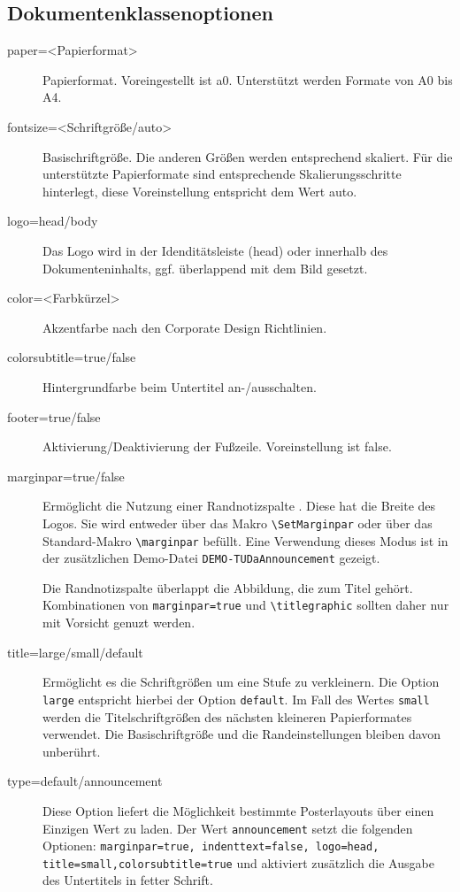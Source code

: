 \documentclass[
	paper=a0,
	ngerman,
	accentcolor=9c,
	logo=body,%
	footer=true,
	]{tudaposter}
\let\file\texttt
\let\code\texttt
\let\tbs\textbackslash
\begin{document}
\begin{multicols}{2}
\subsection*{Dokumentenklassenoptionen}
\begin{description}
	\item[paper=<Papierformat>] Papierformat. Voreingestellt ist a0. Unterstützt werden Formate von A0 bis A4.
	\item[fontsize=<Schriftgröße/auto>] Basischriftgröße. Die anderen Größen werden entsprechend skaliert. Für die unterstützte Papierformate sind entsprechende Skalierungsschritte hinterlegt, diese Voreinstellung entspricht dem Wert auto.
	\item[logo=head/body] Das Logo wird in der Idenditätsleiste (head) oder innerhalb des Dokumenteninhalts, ggf. überlappend mit dem Bild gesetzt.
	\item[color=<Farbkürzel>] Akzentfarbe nach den Corporate Design Richtlinien.
	\item[colorsubtitle=true/false] Hintergrundfarbe beim Untertitel an-/ausschalten.
	\item[footer=true/false] Aktivierung/Deaktivierung der Fußzeile. Voreinstellung ist false.
	\item[marginpar=true/false] Ermöglicht die Nutzung einer Randnotizspalte . Diese hat die Breite des Logos. Sie wird entweder über das Makro \code{\tbs{}SetMarginpar} oder über das Standard-Makro \code{\tbs{}marginpar} befüllt. Eine Verwendung dieses Modus ist in der zusätzlichen Demo-Datei \file{DEMO-TUDaAnnouncement} gezeigt.

	Die Randnotizspalte überlappt die Abbildung, die zum Titel gehört. Kombinationen von \code{marginpar=true} und \code{\tbs{}titlegraphic} sollten daher nur mit Vorsicht genuzt werden.

	\item[title=large/small/default] Ermöglicht es die Schriftgrößen um eine Stufe zu verkleinern. Die Option \code{large} entspricht hierbei der Option \code{default}. Im Fall des Wertes \code{small} werden die Titelschriftgrößen des nächsten kleineren Papierformates verwendet. Die Basischriftgröße und die Randeinstellungen bleiben davon unberührt.
	\item[type=default/announcement] Diese Option liefert die Möglichkeit bestimmte Posterlayouts über einen Einzigen Wert zu laden.
	Der Wert \code{announcement} setzt die folgenden Optionen: \code{marginpar=true, indenttext=false, logo=head, title=small,colorsubtitle=true} und aktiviert zusätzlich die Ausgabe des Untertitels in fetter Schrift.
\end{description}
\end{multicols}
\end{document}
